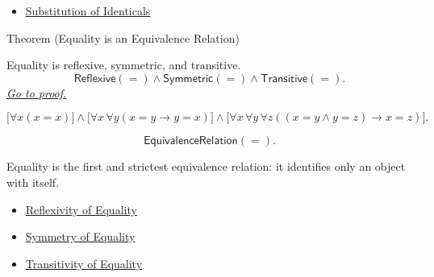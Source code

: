 
\begin{dependencies}
\begin{itemize}
  \item \hyperref[ax:axiomatic-equality-substitution]{Substitution of Identicals}
\end{itemize}
\end{dependencies}

\begin{theorembox}{Theorem (Equality is an Equivalence Relation)}
\begin{theorem}\label{thm:axiomatic-equality-equivalence-relation}
Equality is reflexive, symmetric, and transitive.
\[
  \mathsf{Reflexive}(=)\land\mathsf{Symmetric}(=)\land\mathsf{Transitive}(=).
\]
\hyperref[prf:axiomatic-equality-equivalence-relation]{\textit{Go to proof.}}
\end{theorem}
\end{theorembox}

\begin{remark*}
\[
  \bigl[\forall x(x=x)\bigr]
  \land
  \bigl[\forall x\,\forall y(x=y\to y=x)\bigr]
  \land
  \bigl[\forall x\,\forall y\,\forall z((x=y\land y=z)\to x=z)\bigr].
\]
\end{remark*}

\begin{remark*}
\[
  \mathsf{EquivalenceRelation}(=).
\]
\end{remark*}

\begin{remark*}[Interpretation]
Equality is the first and strictest equivalence relation: it identifies only an
object with itself.
\end{remark*}


\begin{dependencies}
\begin{itemize}
  \item \hyperref[ax:axiomatic-equality-reflexivity]{Reflexivity of Equality}
  \item \hyperref[thm:axiomatic-equality-symmetry]{Symmetry of Equality}
  \item \hyperref[thm:axiomatic-equality-transitivity]{Transitivity of Equality}
\end{itemize}
\end{dependencies}


